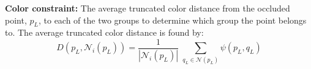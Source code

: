\textbf{Color constraint:} The average truncated color distance from the occluded point, $p_L$, to each of the two groups to determine which group the point belongs to. The average truncated color distance is found by:
\begin{equation}
D(p_L,\mathcal{N}_i(p_L) ) = \dfrac{1}{|\mathcal{N}_i(p_L)|} \; \sum_{q_L \in \mathcal{N}(p_L)} \psi (p_L,q_L) 
\end{equation}

